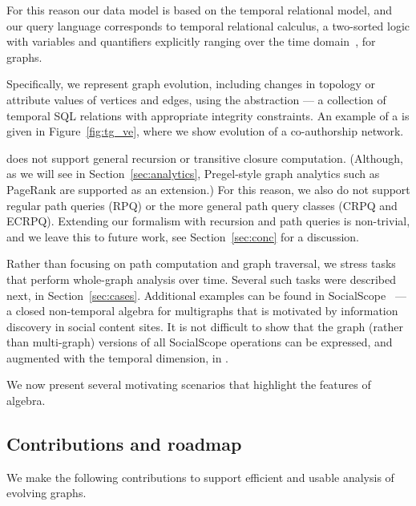 For this reason our data model is based on the temporal relational
model, and our query language corresponds to temporal relational
calculus, a two-sorted logic with variables and quantifiers explicitly
ranging over the time domain~\cite{DBLP:reference/db/Toman09}, for
graphs.

Specifically, we represent graph evolution, including changes in
topology or attribute values of vertices and edges, using the \tg
abstraction --- a collection of temporal SQL relations with
appropriate integrity constraints.  An example of a \tg is given in
Figure~\ref{fig:tg_ve}, where we show evolution of a co-authorship
network.  

\tga does not support general recursion or transitive closure
computation. (Although, as we will see in Section~\ref{sec:analytics},
Pregel-style graph analytics such as PageRank are supported as an
extension.)  For this reason, we also do not support regular path
queries (RPQ) or the more general path query classes (CRPQ and ECRPQ).
Extending our formalism with recursion and path queries is
non-trivial, and we leave this to future work, see
Section~\ref{sec:conc} for a discussion.

Rather than focusing on path computation and graph traversal, we
stress tasks that perform whole-graph analysis over time.  Several
such tasks were described next, in Section~\ref{sec:cases}.
Additional examples can be found in SocialScope~\cite{Amer-Yahia2009}
--- a closed non-temporal algebra for multigraphs that is motivated by
information discovery in social content sites.  It is not difficult to
show that the graph (rather than multi-graph) versions of all
SocialScope operations can be expressed, and augmented with the
temporal dimension, in \tga.

We now present several motivating scenarios that highlight
the features of \ql algebra.



%

\subsection{Contributions and roadmap}

We make the following contributions to support efficient and usable
analysis of evolving graphs.

